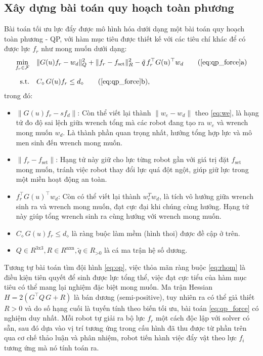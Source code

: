 \subsection{Xây dựng bài toán quy hoạch toàn phương}
Bài toán tối ưu lực đẩy được mô hình hóa dưới dạng một bài toán quy hoạch toàn phương - QP, với hàm mục tiêu được thiết kế với các tiêu chí khác để có được lực $f_r$ như mong muốn dưới dạng:
\begin{subequations}
\label{eq:qp_force}
\begin{align}
\min_{f_r \in \mathcal{F}} \quad 
& \|G(u) f_r - w_d\|_{Q}^{2}
  + \|f_r - f_{\mathrm{set}}\|_{R}^{2}
  - \tilde{q}\, f_r^\top G(u)^\top w_d
\tag{\ref{eq:qp_force}a}
\\[6pt]
\label{eq:rhom}
\text{s.t.} \quad 
& C_\diamond \, G(u) f_r \le d_\diamond
\tag{\ref{eq:qp_force}b},
\end{align}
\end{subequations}
trong đó:
\begin{itemize}
    \item $\|G(u) f_r - s f_d\|$: Còn thể viết lại thành $\|w_e - w_d\|$ theo \ref{eq:we}, là hạng tử đo độ sai lệch giữa wrench tổng mà các robot đang tạo ra $w_e$ và wrench mong muốn $w_d$. Là thành phần quan trọng nhất, hướng tổng hợp lực và mô men sinh đến wrench mong muốn.
    \item $\|f_r - f_{\mathrm{set}}\|$: Hạng tử này giữ cho lực từng robot gần với giá trị đặt $f_{\mathrm{set}}$ mong muốn, tránh việc robot thay đổi lực quá đột ngột, giúp giữ lực trong một miền hoạt động an toàn.
    \item $f_r^\top G(u)^\top w_d$: Còn có thể viết lại thành $w_e^T w_d$, là tích vô hướng giữa wrench sinh ra và wrench mong muốn, đạt cực đại khi chúng cùng hướng. Hạng tử này giúp tổng wrench sinh ra cùng hướng với wrench mong muốn.
    \item $C_\diamond \, G(u) f_r \le d_\diamond$ là ràng buộc làm mềm (hình thoi) được đề cập ở trên.
    \item $Q \in R^{\text{3x3}} ,R \in R^{\text{nxn}} , \tilde{q} \in R_{\text{>0}}$ là cá ma trận hệ số dương.
\end{itemize}

Tương tự bài toán tìm đội hình \ref{eq:op}, việc thỏa mãn ràng buộc \ref{eq:rhom} là điều kiện tiên quyết để sinh được lực tổng thể, việc đạt cực tiểu của hàm mục tiêu có thể mang lại nghiệm đặc biệt mong muốn. Ma trận Hessian $H = 2(G^\top Q\, G + R)$ là bán dương (semi-positive), tuy nhiên ra có thể giả thiết $R > 0$ và do số hạng cuối là tuyến tính theo biến tối ưu, bài toán \ref{eq:qp_force} có nghiệm duy nhất. Mỗi robot tự giải ra bộ lực $f_r$ một cách độc lập với solver có sẵn, sau đó dựa vào vị trí tương ứng trong cấu hình đã thu được từ phần trên qua cơ chế thảo luận và phân nhiệm, robot tiến hành việc đẩy vật theo lực $f_i$ tương ứng mà nó tính toán ra.

